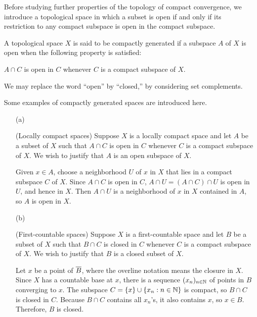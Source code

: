 Before studying further properties of the topology of compact convergence, we introduce a topological space in which a subset is open if and only if its restriction to any compact subspace is open in the compact subspace.
\begin{defi}
    A topological space $X$ is said to be compactly generated if a subspace $A$ of $X$ is open when the following property is satisfied:
    \begin{center}
        $A\cap C$ is open in $C$ whenever $C$ is a compact subspace of $X$.
    \end{center}
\end{defi}
\begin{rmk}
    We may replace the word ``open'' by ``closed,'' by considering set complements.
\end{rmk}
\begin{exmp}
    Some examples of compactly generated spaces are introduced here.
    \begin{enumerate}
        \item[(a)]
        {
            (Locally compact spaces)
            Suppose $X$ is a locally compact space and let $A$ be a subset of $X$ such that $A\cap C$ is open in $C$ whenever $C$ is a compact subspace of $X$.
            We wish to justify that $A$ is an open subspace of $X$.

            Given $x\in A$, choose a neighborhood $U$ of $x$ in $X$ that lies in a compact subspace $C$ of $X$.
            Since $A\cap C$ is open in $C$, $A\cap U=(A\cap C)\cap U$ is open in $U$, and hence in $X$.
            Then $A\cap U$ is a neighborhood of $x$ in $X$ contained in $A$, so $A$ is open in $X$.
        }
        \item[(b)]
        {
            (First-countable spaces)
            Suppose $X$ is a first-countable space and let $B$ be a subset of $X$ such that $B\cap C$ is closed in $C$ whenever $C$ is a compact subspace of $X$.
            We wish to justify that $B$ is a closed subset of $X$.

            Let $x$ be a point of $\overline{B}$, where the overline notation means the closure in $X$.
            Since $X$ has a countable base at $x$, there is a sequence $(x_n)_{n\in{\mathbb{N}}}$ of points in $B$ converging to $x$.
            The subspace $C=\{x\}\cup\{x_n: n\in{\mathbb{N}}\}$ is compact, so $B\cap C$ is closed in $C$.
            Because $B\cap C$ contains all $x_n$'s, it also contains $x$, so $x\in B$.
            Therefore, $B$ is closed.
        }
    \end{enumerate}
\end{exmp}

